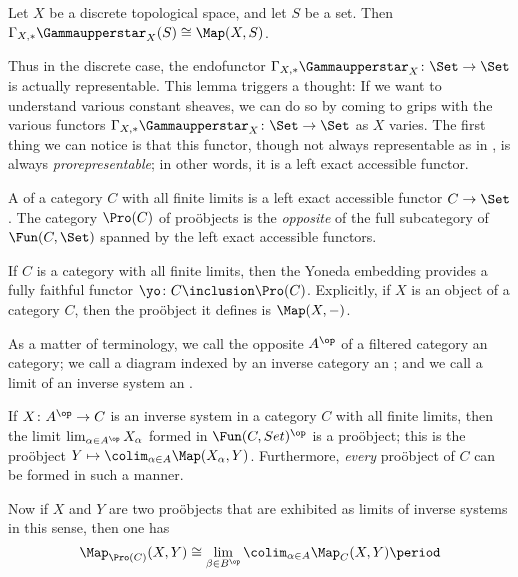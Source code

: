 \begin{lem}\label{asetisitsownshape}
	Let $ X $ be a discrete topological space, and let $ S $ be a set.
	Then $ \Gamma_{X, \ast} \Gammaupperstar_X ( S ) \cong \Map(X, S ) $. 
\end{lem}

Thus in the discrete case, the endofunctor $ \Gamma_{X, \ast} \Gammaupperstar_X \colon \Set \to \Set $ is actually representable.
This lemma triggers a thought:
If we want to understand various constant sheaves, we can do so by coming to grips with the various functors $ \Gamma_{X, \ast} \Gammaupperstar_X \colon \Set \to \Set $ as $ X $ varies.
The first thing we can notice is that this functor, though not always representable as in , is always \emph{prorepresentable};
in other words, it is a left exact accessible functor.

\begin{dfn}
	A  of a category $ C $ with all finite limits is a left exact accessible functor $ C \to \Set $.
	The category $ \Pro(C) $ of proöbjects is the \emph{opposite} of the full subcategory of $ \Fun(C, \Set) $ spanned by the left exact accessible functors.
\end{dfn}

\begin{exm}
	If $ C $ is a category with all finite limits, then the Yoneda embedding provides a fully faithful functor $ \yo \colon C \inclusion \Pro(C) $.
	Explicitly, if $ X $ is an object of a category $ C $, then the proöbject it defines is $ \Map(X, -) $.
\end{exm}

\begin{exm}
	As a matter of terminology, we call the opposite $ A^{\op} $ of a filtered category an  category;
	we call a diagram indexed by an inverse category an ;
	and we call a limit of an inverse system an .

	If $ X \colon A^{\op} \to C $ is an inverse system in a category $ C $ with all finite limits, then the limit $ \lim_{\alpha \in A^{\op}} X_{\alpha} $ formed in $ \Fun(C, Set)^{\op} $ is a proöbject;
	this is the proöbject $ Y \mapsto \colim_{\alpha \in A} \Map(X_{\alpha}, Y) $.
	Furthermore, \emph{every} proöbject of $ C $ can be formed in such a manner.

	Now if $ X $ and $ Y $ are two proöbjects that are exhibited as limits of inverse systems in this sense, then one has
	\[
		\Map_{\Pro(C)}(X, Y) \cong \lim_{\beta \in B^{\op}} \colim_{\alpha \in A} \Map_C(X, Y) \period
	\]
\end{exm}

